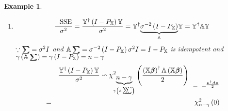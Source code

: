 \documentclass{article}
\newtheorem{example}[theorem]{Example}
\begin{document}
\begin{example}
\begin{enumerate}
\item 
\begin{equation*}
\frac{\text{SSE}}{\sigma ^{2}}=\frac{\mathbb{Y}^{\dagger }\left( I-P_{%
\mathbb{X}}\right) \mathbb{Y}}{\sigma ^{2}}=\mathbb{Y}^{\dagger }\underset{%
\mathbb{A}}{\underbrace{\sigma ^{-2}\left( I-P_{\mathbb{X}}\right) }}\mathbb{%
Y=Y}^{\dagger }\mathbb{AY}
\end{equation*}%
$\because 
\tsum\mkern-20mu\tsum%
=\sigma ^{2}I$ and $\mathbb{A}%
\tsum\mkern-20mu\tsum%
=\sigma ^{-2}\left( I-P_{\mathbb{X}}\right) \sigma ^{2}I=I-P_{\mathbb{X}}$
is idempotent and $\gamma \left( \mathbb{A}%
\tsum\mkern-20mu\tsum%
\right) =\gamma \left( I-P_{\mathbb{X}}\right) =n-\gamma $%
\begin{eqnarray*}
&\therefore &\frac{\mathbb{Y}^{\dagger }\left( I-P_{\mathbb{X}}\right) 
\mathbb{Y}}{\sigma ^{2}}\backsim \chi _{\underset{\gamma \left( \mathbb{A}%
\tsum\mkern-20mu\tsum%
\right) }{\underbrace{n-\gamma }}}^{2}\left( \frac{\left( \mathbb{X}%
\beta\mkern-9.6mu \beta%
\right) ^{\dagger }\mathbb{A}\left( \mathbb{X}%
\beta\mkern-9.6mu \beta%
\right) }{2}\right) _{\_\_\frac{\mu ^{\dagger }A\mu }{2}} \\
&=&\chi _{n-\gamma }^{2}\left( 0\right) 
\end{eqnarray*}


\end{enumerate}
\end{example}
\end{document}
